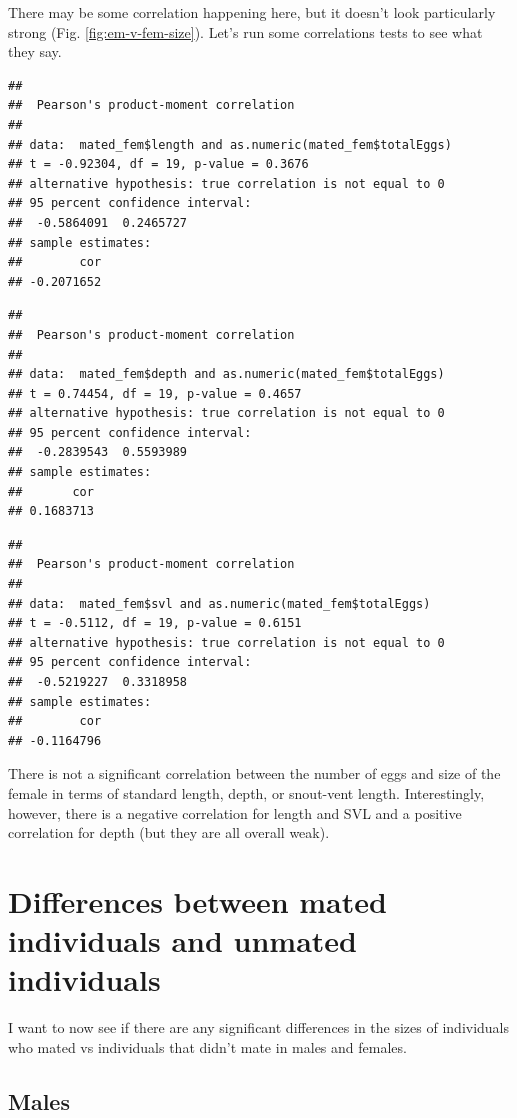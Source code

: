 \documentclass[
]{article}
\begin{document}
There may be some correlation happening here, but it doesn't look particularly strong (Fig. \ref{fig:em-v-fem-size}). Let's run some correlations tests to see what they say.

\begin{verbatim}
## 
##  Pearson's product-moment correlation
## 
## data:  mated_fem$length and as.numeric(mated_fem$totalEggs)
## t = -0.92304, df = 19, p-value = 0.3676
## alternative hypothesis: true correlation is not equal to 0
## 95 percent confidence interval:
##  -0.5864091  0.2465727
## sample estimates:
##        cor 
## -0.2071652
\end{verbatim}

\begin{verbatim}
## 
##  Pearson's product-moment correlation
## 
## data:  mated_fem$depth and as.numeric(mated_fem$totalEggs)
## t = 0.74454, df = 19, p-value = 0.4657
## alternative hypothesis: true correlation is not equal to 0
## 95 percent confidence interval:
##  -0.2839543  0.5593989
## sample estimates:
##       cor 
## 0.1683713
\end{verbatim}

\begin{verbatim}
## 
##  Pearson's product-moment correlation
## 
## data:  mated_fem$svl and as.numeric(mated_fem$totalEggs)
## t = -0.5112, df = 19, p-value = 0.6151
## alternative hypothesis: true correlation is not equal to 0
## 95 percent confidence interval:
##  -0.5219227  0.3318958
## sample estimates:
##        cor 
## -0.1164796
\end{verbatim}

There is not a significant correlation between the number of eggs and size of the female in terms of standard length, depth, or snout-vent length. Interestingly, however, there is a negative correlation for length and SVL and a positive correlation for depth (but they are all overall weak).

\hypertarget{differences-between-mated-individuals-and-unmated-individuals}{%
\section{Differences between mated individuals and unmated individuals}\label{differences-between-mated-individuals-and-unmated-individuals}}

I want to now see if there are any significant differences in the sizes of individuals who mated vs individuals that didn't mate in males and females.

\hypertarget{males-1}{%
\subsection{Males}\label{males-1}}
\end{document}

